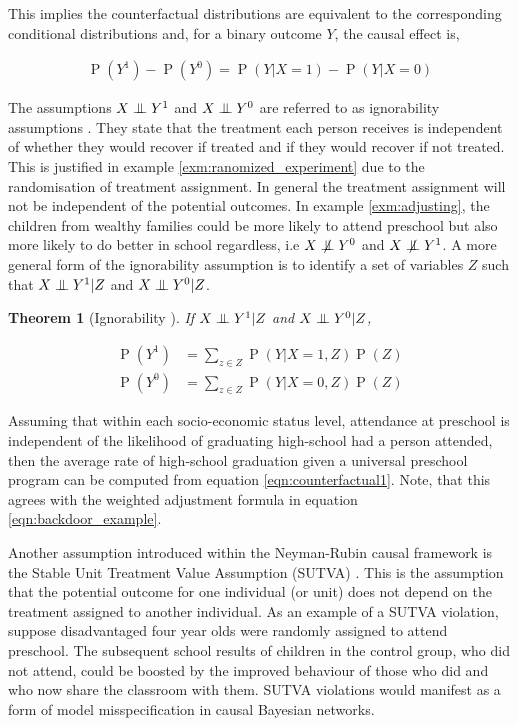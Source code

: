 \documentclass[11pt,a4paper,twoside]{report}
\newcommand{\eqn}[1]{\begin{align}#1\end{align}}
\newcommand{\eq}[1]{\begin{align*}#1\end{align*}}
\renewcommand{\P}[1]{\operatorname{P}\left(#1\right)}
\newcommand{\cf}[2]{{#1}^{#2}}
\theoremstyle{plain}
\newtheorem{theorem}{Theorem}
\theoremstyle{definition}
\newcommand{\ci}{\mathrel{\perp\mspace{-10mu}\perp}}
\newcommand{\nci}{\centernot{\ci}}
\begin{document}
This implies the counterfactual distributions are equivalent to the corresponding conditional distributions and, for a binary outcome $Y$, the causal effect is,

\eq{
\P{Y^{1}}-\P{Y^{0}} = \P{Y|X=1} - \P{Y|X=0}
}

The assumptions $X \ci Y^{1}$ and $X \ci Y^{0}$  are referred to as ignorability assumptions \citep{Rosenbaum1983}. They state that the treatment each person receives is independent of whether they would recover if treated and if they would recover if not treated. This is justified in example \ref{exm:ranomized_experiment} due to the randomisation of treatment assignment. In general the treatment assignment will not be independent of the potential outcomes. In example \ref{exm:adjusting}, the children from wealthy families could be more likely to attend preschool but also more likely to do better in school regardless, i.e $X \nci \cf{Y}{0}$ and $X \nci \cf{Y}{1}$. A more general form of the ignorability assumption is to identify a set of variables $Z$ such that $X \ci Y^{1}|Z$ and $X \ci Y^{0}|Z$. 

\vspace*{.3cm}
\begin{theorem}[Ignorability \citep{Rosenbaum1983, Pearl2000}] If $X \ci Y^{1}|Z$ and $X \ci Y^{0}|Z$,

\eqn{
\label{eqn:counterfactual1}
\P{\cf{Y}{1}} &= \sum_{z \in Z}\P{Y|X=1,Z}\P{Z}  \\
\label{eqn:counterfactual2}
\P{\cf{Y}{0}} &= \sum_{z \in Z}\P{Y|X=0,Z}\P{Z}
}
\end{theorem}

Assuming that within each socio-economic status level, attendance at preschool is independent of the likelihood of graduating high-school had a person attended, then the average rate of high-school graduation given a universal preschool program can be computed from equation \ref{eqn:counterfactual1}. Note, that this agrees with the weighted adjustment formula in equation \ref{eqn:backdoor_example}. 

Another assumption introduced within the Neyman-Rubin causal framework is the Stable Unit Treatment Value Assumption (SUTVA) \citep{Rubin1978}. This is the assumption that the potential outcome for one individual (or unit) does not depend on the treatment assigned to another individual. As an example of a SUTVA violation, suppose disadvantaged four year olds were randomly assigned to attend preschool. The subsequent school results of children in the control group, who did not attend, could be boosted by the improved behaviour of those who did and who now share the classroom with them. SUTVA violations would manifest as a form of model misspecification in causal Bayesian networks. 
\end{document}
